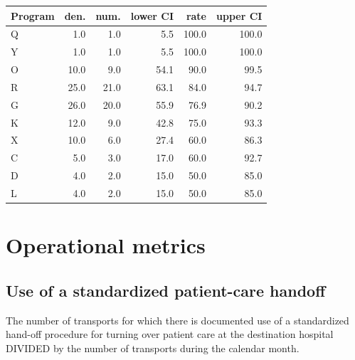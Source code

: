 \documentclass[twoside]{article}\usepackage[]{graphicx}\usepackage[]{color}
\begin{document}
\begin{table}[ht]
\centering
\begin{tabular}{lrrrrr}
  \hline
Program & den. & num. & lower CI & rate & upper CI \\ 
  \hline
Q & 1.0 & 1.0 & 5.5 & 100.0 & 100.0 \\ 
  Y & 1.0 & 1.0 & 5.5 & 100.0 & 100.0 \\ 
  O & 10.0 & 9.0 & 54.1 & 90.0 & 99.5 \\ 
  R & 25.0 & 21.0 & 63.1 & 84.0 & 94.7 \\ 
  G & 26.0 & 20.0 & 55.9 & 76.9 & 90.2 \\ 
  K & 12.0 & 9.0 & 42.8 & 75.0 & 93.3 \\ 
  X & 10.0 & 6.0 & 27.4 & 60.0 & 86.3 \\ 
  C & 5.0 & 3.0 & 17.0 & 60.0 & 92.7 \\ 
  D & 4.0 & 2.0 & 15.0 & 50.0 & 85.0 \\ 
  L & 4.0 & 2.0 & 15.0 & 50.0 & 85.0 \\ 
   \hline
\end{tabular}
\end{table}






\newpage
\section{Operational metrics}
\subsection{Use of a standardized patient-care handoff}
The number of transports for which there is documented use of a standardized hand-off procedure for turning over patient care at the destination hospital DIVIDED by the number of transports during the calendar month.
\end{document}
